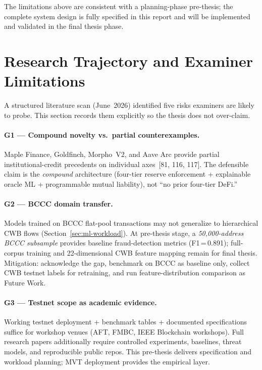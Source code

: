 \documentclass[12pt,a4paper]{report}
\begin{document}
The limitations above are consistent with a planning-phase pre-thesis; the complete system design is fully specified in this report and will be implemented and validated in the final thesis phase.

\section{Research Trajectory and Examiner Limitations}
\label{sec:research-limitations}

A structured literature scan (June~2026) identified five risks examiners are likely to probe. This section records them explicitly so the thesis does not over-claim.

\paragraph{G1 --- Compound novelty vs.\ partial counterexamples.}
Maple Finance, Goldfinch, Morpho~V2, and Aave Arc provide partial institutional-credit precedents on individual axes~[81, 116, 117]. The defensible claim is the \textit{compound} architecture (four-tier reserve enforcement + explainable oracle ML + programmable mutual liability), not ``no prior four-tier DeFi.''

\paragraph{G2 --- BCCC domain transfer.}
Models trained on BCCC flat-pool transactions may not generalize to hierarchical CWB flows (Section~\ref{sec:ml-workload}). At pre-thesis stage, a \textit{50{,}000-address BCCC subsample} provides baseline fraud-detection metrics (F1\,=\,0.891); full-corpus training and 22-dimensional CWB feature mapping remain for final thesis. Mitigation: acknowledge the gap, benchmark on BCCC as baseline only, collect CWB testnet labels for retraining, and run feature-distribution comparison as Future Work.

\paragraph{G3 --- Testnet scope as academic evidence.}
Working testnet deployment + benchmark tables + documented specifications suffice for workshop venues (AFT, FMBC, IEEE Blockchain workshops). Full research papers additionally require controlled experiments, baselines, threat models, and reproducible public repos. This pre-thesis delivers specification and workload planning; MVT deployment provides the empirical layer.
\end{document}
